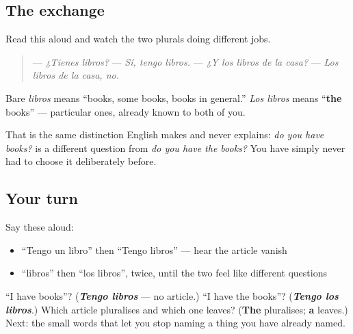 \subsection*{The exchange}
Read this aloud and watch the two plurals doing different jobs.

\begin{quote}
— \emph{¿Tienes libros?} — \emph{Sí, tengo libros.} — \emph{¿Y los libros de la casa?} — \emph{Los libros de la casa, no.}
\end{quote}

Bare \emph{libros} means \textquotedblleft{}books, some books, books in general.\textquotedblright{} \emph{Los libros} means \textquotedblleft{}\textbf{the} books\textquotedblright{} — particular ones, already known to both of you.

That is the same distinction English makes and never explains: \emph{do you have books?} is a different question from \emph{do you have the books?} You have simply never had to choose it deliberately before.

\subsection*{Your turn}
Say these aloud:

\begin{itemize}
\raggedright
  \item \textquotedblleft{}Tengo un libro\textquotedblright{} then \textquotedblleft{}Tengo libros\textquotedblright{} — hear the article vanish
  \item \textquotedblleft{}libros\textquotedblright{} then \textquotedblleft{}los libros\textquotedblright{}, twice, until the two feel like different questions
\end{itemize}

\begin{tcolorbox}[breakable,colback=teal!4,colframe=teal!35!black,title={Before you move on}]
\textquotedblleft{}I have books\textquotedblright{}? (\emph{\textbf{Tengo libros}} — no article.) \textquotedblleft{}I have the books\textquotedblright{}? (\emph{\textbf{Tengo los libros}}.) Which article pluralises and which one leaves? (\textbf{The} pluralises; \textbf{a} leaves.) Next: the small words that let you stop naming a thing you have already named.
\end{tcolorbox}
